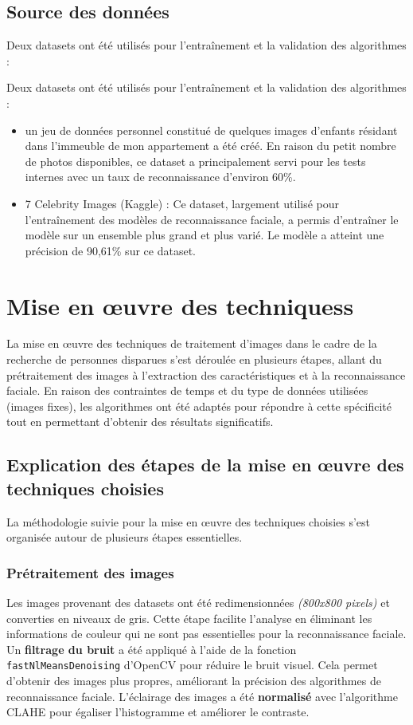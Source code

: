 \documentclass[a4paper,12pt]{report}
\begin{document}
\subsection{Source des données}
Deux datasets ont été utilisés pour l'entraînement et la validation des algorithmes :

Deux datasets ont été utilisés pour l'entraînement et la validation des algorithmes :
\begin{itemize}
    \item un jeu de données personnel constitué de quelques images d'enfants résidant dans l'immeuble de mon appartement a été créé. En raison du petit nombre de photos disponibles, ce dataset a principalement servi pour les tests internes avec un taux de reconnaissance d'environ 60\%.
    \item 7 Celebrity Images (Kaggle) : Ce dataset, largement utilisé pour l'entraînement des modèles de reconnaissance faciale, a permis d'entraîner le modèle sur un ensemble plus grand et plus varié. Le modèle a atteint une précision de 90,61\% sur ce dataset.
\end{itemize}

\section{Mise en œuvre des techniquess}
La mise en œuvre des techniques de traitement d’images dans le cadre de la recherche de personnes disparues s'est déroulée en plusieurs étapes, allant du prétraitement des images à l’extraction des caractéristiques et à la reconnaissance faciale. En raison des contraintes de temps et du type de données utilisées (images fixes), les algorithmes ont été adaptés pour répondre à cette spécificité tout en permettant d’obtenir des résultats significatifs.

\subsection{Explication des étapes de la mise en œuvre des techniques choisies}
La méthodologie suivie pour la mise en œuvre des techniques choisies s’est organisée autour de plusieurs étapes essentielles. 
\subsubsection{Prétraitement des images}
Les images provenant des datasets ont été redimensionnées \textit{(800x800 pixels)} et converties en niveaux de gris. Cette étape facilite l’analyse en éliminant les informations de couleur qui ne sont pas essentielles pour la reconnaissance faciale. Un \textbf{filtrage du bruit} a été appliqué à l’aide de la fonction \texttt{fastNlMeansDenoising} d’OpenCV pour réduire le bruit visuel. Cela permet d'obtenir des images plus propres, améliorant la précision des algorithmes de reconnaissance faciale. L'éclairage des images a été \textbf{normalisé} avec l'algorithme CLAHE pour égaliser l'histogramme et améliorer le contraste.
\end{document}
